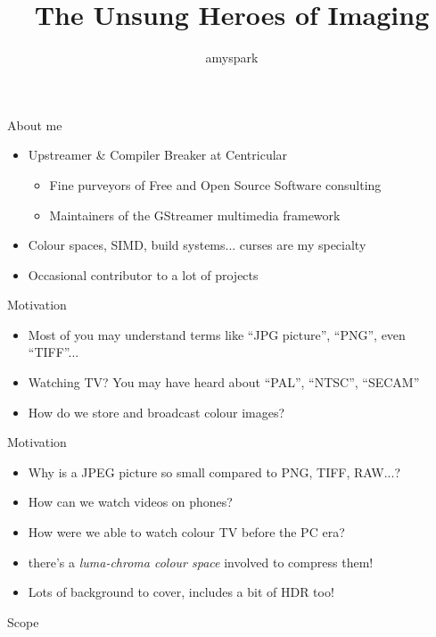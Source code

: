 \documentclass[aspectratio=169,usepdftitle=false]{fireshonks}
\title{The Unsung Heroes of Imaging}
\author{amyspark}
\date{\DTMdate{2023-12-27}}
\begin{document}
\maketitle

\begin{frame}{About me}
    \begin{itemize}[<*>]
        \item Upstreamer \& Compiler Breaker at Centricular
              \begin{itemize}[<*>]
                  \item Fine purveyors of Free and Open Source Software consulting
                  \item Maintainers of the GStreamer multimedia framework
              \end{itemize}
        \item Colour spaces, SIMD, build systems... curses are my specialty 
        \item Occasional contributor to a lot of projects
    \end{itemize}
\end{frame}
\begin{frame}{Motivation}
    \begin{itemize}
        \item Most of you may understand terms like \enquote{JPG picture}, \enquote{PNG}, even \enquote{TIFF}...
        \item Watching TV? You may have heard about \enquote{PAL}, \enquote{NTSC}, \enquote{SECAM}
        \item How do we store and broadcast colour images?
    \end{itemize}
\end{frame}

\begin{frame}{Motivation}
    \begin{itemize}
        \item Why is a JPEG picture so small compared to PNG, TIFF, RAW...?
        \item How can we watch  videos on phones?
        \item How were we able to watch colour TV before the PC era?
        \item {} there's a \emph{luma-chroma colour space} involved to compress them!
        \item Lots of background to cover, includes a bit of HDR too!
    \end{itemize}
\end{frame}
\begin{frame}{Scope}
    \tableofcontents
\end{frame}
\end{document}
